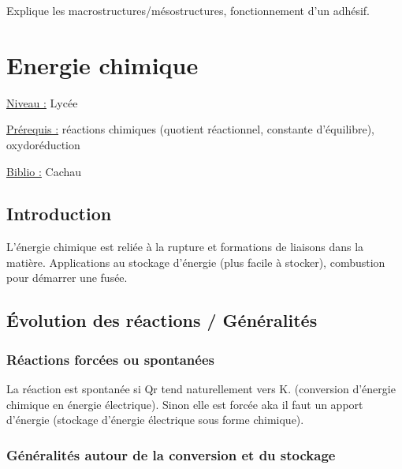 \documentclass{article}%
\begin{document}
Explique les macrostructures/mésostructures, fonctionnement d'un adhésif.

\section{Energie chimique}
\underline{Niveau :} Lycée

\underline{Prérequis :} réactions chimiques (quotient réactionnel, constante d'équilibre), oxydoréduction

\underline{Biblio :} Cachau

\subsection{Introduction}

L'énergie chimique est reliée à la rupture et formations de liaisons dans la matière. Applications au stockage d'énergie (plus facile à stocker), combustion pour démarrer une fusée.

\subsection{Évolution des réactions / Généralités}

\subsubsection{Réactions forcées ou spontanées}


La réaction est spontanée si Qr tend naturellement vers K. (conversion d'énergie chimique en énergie électrique). Sinon elle est forcée aka il faut un apport d'énergie (stockage d'énergie électrique sous forme chimique).

\subsubsection{Généralités autour de la conversion et du stockage}
\end{document}
